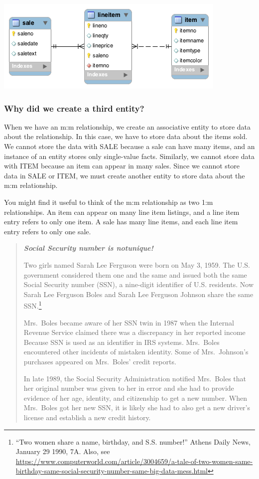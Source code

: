 \documentclass[
]{article}
\begin{document}
\includegraphics{Figures/Chapter 5/sale-item-wb.png}

\hypertarget{why-did-we-create-a-third-entity}{%
\subsubsection{Why did we create a third
entity?}\label{why-did-we-create-a-third-entity}}

When we have an m:m relationship, we create an associative entity to
store data about the relationship. In this case, we have to store data
about the items sold. We cannot store the data with SALE because a sale
can have many items, and an instance of an entity stores only
single-value facts. Similarly, we cannot store data with ITEM because an
item can appear in many sales. Since we cannot store data in SALE or
ITEM, we must create another entity to store data about the m:m
relationship.

You might find it useful to think of the m:m relationship as two 1:m
relationships. An item can appear on many line item listings, and a line
item entry refers to only one item. A sale has many line items, and each
line item entry refers to only one sale.

\begin{quote}
\textbf{\emph{Social Security number is notunique!}}

Two girls named Sarah Lee Ferguson were born on May 3, 1959. The U.S.
government considered them one and the same and issued both the same
Social Security number (SSN), a nine-digit identifier of U.S. residents.
Now Sarah Lee Ferguson Boles and Sarah Lee Ferguson Johnson share the
same SSN.\footnote{``Two women share a name, birthday, and S.S.
  number!'' Athens Daily News, January 29 1990, 7A. Also, see
  \url{https://www.computerworld.com/article/3004659/a-tale-of-two-women-same-birthday-same-social-security-number-same-big-data-mess.html}}

Mrs.~Boles became aware of her SSN twin in 1987 when the Internal
Revenue Service claimed there was a discrepancy in her reported income
Because SSN is used as an identifier in IRS systems. Mrs.~Boles
encountered other incidents of mistaken identity. Some of Mrs.~Johnson's
purchases appeared on Mrs.~Boles' credit reports.

In late 1989, the Social Security Administration notified Mrs.~Boles
that her original number was given to her in error and she had to
provide evidence of her age, identity, and citizenship to get a new
number. When Mrs.~Boles got her new SSN, it is likely she had to also
get a new driver's license and establish a new credit history.
\end{quote}
\end{document}
